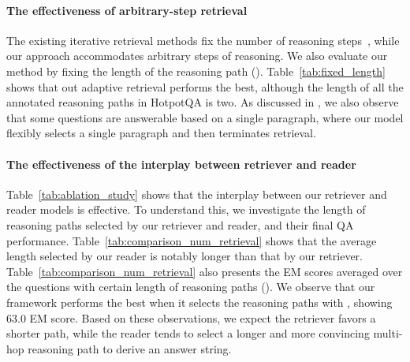 \documentclass{article} \usepackage{iclr2020_conference,times}
\begin{document}
\vspace{-2mm}\paragraph{The effectiveness of arbitrary-step retrieval}
The existing iterative retrieval methods fix the number of reasoning steps~\citep{qi2019answering,das2019multi,godbole2019entity_links,muppet2019multihop}, while our approach accommodates arbitrary steps of reasoning.
We also evaluate our method by fixing the length of the reasoning path ().
Table~\ref{tab:fixed_length} shows that out adaptive retrieval performs the best, although the length of all the annotated reasoning paths in HotpotQA is two.
As discussed in \cite{min2019compositional}, we also observe that some questions are answerable based on a single paragraph, where our model flexibly selects a single paragraph and then terminates retrieval.


\vspace{-2mm}
\paragraph{The effectiveness of the interplay between retriever and reader}
Table~\ref{tab:ablation_study} shows that the interplay between our retriever and reader models is effective.
To understand this, we investigate the length of reasoning paths selected by our retriever and reader, and their final QA performance.
Table~\ref{tab:comparison_num_retrieval} shows that the average length selected by our reader is notably longer than that by our retriever.
Table~\ref{tab:comparison_num_retrieval} also presents the EM scores averaged over the questions with certain length of reasoning paths (). 
We observe that our framework performs the best when it selects the reasoning paths with , showing 63.0 EM score.
Based on these observations, we expect the retriever favors a shorter path, while the reader tends to select a longer and more convincing multi-hop reasoning path to derive an answer string. 
\end{document}
